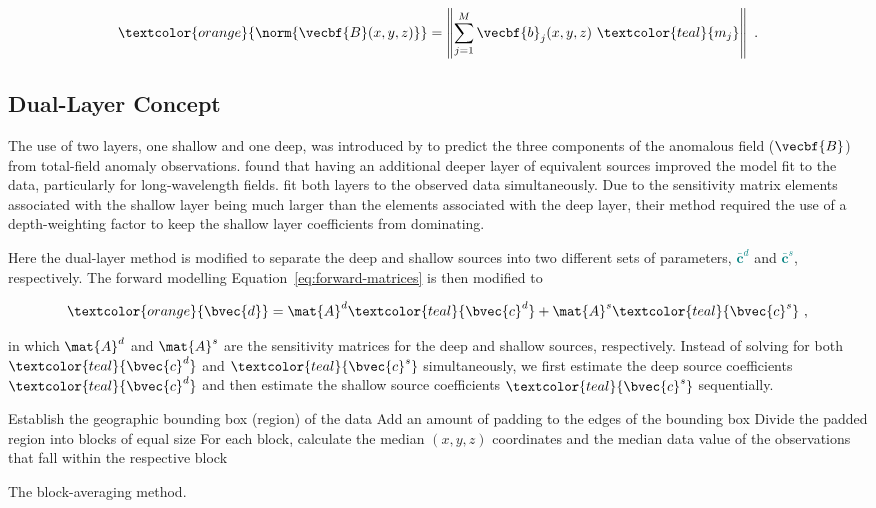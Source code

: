 \begin{equation}
\textcolor{orange}{\norm{\vecbf{B}(x,y,z)}} = \left\lVert 
    \sum_{j=1}^{M} \vecbf{b}_{j}(x,y,z)\ \textcolor{teal}{m_j} 
\right\rVert
\ .
\end{equation}


\subsection{Dual-Layer Concept}

The use of two layers, one shallow and one deep, was introduced by \citet{Li2020} to predict the three components of the anomalous field ($\vecbf{B}$) from total-field anomaly observations. \citet{Li2020} found that having an additional deeper layer of equivalent sources improved the model fit to the data, particularly for long‐wavelength fields. \citet{Li2020} fit both layers to the observed data simultaneously. Due to the sensitivity matrix elements associated with the shallow layer being much larger than the elements associated with the deep layer, their method required the use of a depth-weighting factor to keep the shallow layer coefficients from dominating.

Here the dual-layer method is modified to separate the deep and shallow sources into two different sets of parameters, \textcolor{teal}{$\bar{\mathbf{c}}^d$} and \textcolor{teal}{$\bar{\mathbf{c}}^s$}, respectively.
The forward modelling Equation~\ref{eq:forward-matrices} is then modified to

\begin{equation}
    \textcolor{orange}{\bvec{d}} = \mat{A}^d \textcolor{teal}{\bvec{c}^d}
    +  \mat{A}^s \textcolor{teal}{\bvec{c}^s}
    \ ,
\end{equation}

\noindent
in which $\mat{A}^d$ and $\mat{A}^s$ are the sensitivity matrices for the deep and shallow sources, respectively.
Instead of solving for both $\textcolor{teal}{\bvec{c}^d}$ and $\textcolor{teal}{\bvec{c}^s}$ simultaneously, we first estimate the deep source coefficients $\textcolor{teal}{\bvec{c}^d}$ and then estimate the shallow source coefficients $\textcolor{teal}{\bvec{c}^s}$ sequentially.

\begin{algorithm}[!htb]
  Establish the geographic bounding box (region) of the data
  \;
  Add an amount of padding to the edges of the bounding box
  \;
  Divide the padded region into blocks of equal size
  \;
  For each block, calculate the median $(x, y, z)$ coordinates and the median data value of the observations that fall within the respective block
  \;
  \BlankLine
  \caption{The block-averaging method.}
  \label{alg:block_averaging}
\end{algorithm}

